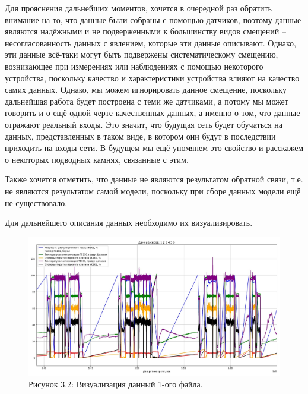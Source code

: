 {  \par \redline Для прояснения дальнейших моментов, хочется в очередной раз обратить внимание на то, что данные были собраны с помощью датчиков, поэтому данные являются надёжными и не подверженными к большинству видов смещений – несогласованность данных с явлением, которые эти данные описывают.  Однако, эти данные всё-таки могут быть подвержены систематическому смещению, возникающее при измерениях или наблюдениях с помощью некоторого устройства, поскольку качество и характеристики устройства влияют на качество самих данных. Однако, мы можем игнорировать данное смещение, поскольку дальнейшая работа будет построена с теми же датчиками, а потому мы может говорить и о ещё одной черте качественных данных, а именно о том, что данные отражают реальный входы. Это значит, что будущая сеть будет обучаться на данных, представленных в таком виде, в котором они будут в последствии приходить на входы сети. В будущем мы ещё упомянем это свойство и расскажем о некоторых подводных камнях, связанные с этим.

  \par \redline Также хочется отметить, что данные не являются результатом обратной связи, т.е. не являются результатом самой модели, поскольку при сборе данных модели ещё не существовало.

  \par \redline Для дальнейшего описания данных необходимо их визуализировать.

  \begin{figure}
    \centering
    \def\svgwidth{\textwidth}
    \includegraphics[width=\textwidth]{images/data_1_visual.jpg}
    \caption*{\gostFont Рисунок 3.2: Визуализация данный 1-ого файла.}
    \label{fig:NNBlackBox}
  \end{figure}

}
